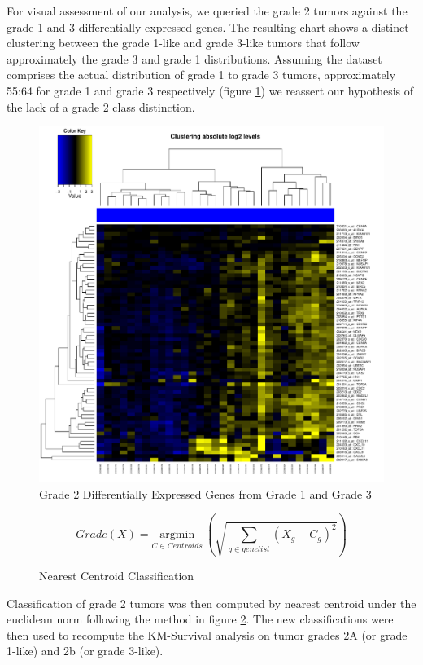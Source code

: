 \documentclass[a4paper,10pt]{article}
\begin{document}
For visual assessment of our analysis, we queried the grade 2 tumors against the grade 1 and 3 differentially expressed genes. The resulting chart
shows a distinct clustering between the grade 1-like and grade 3-like tumors that follow approximately 
the grade 3 and grade 1 distributions. Assuming the dataset comprises the actual distribution 
of grade 1 to grade 3 tumors, approximately 55:64 for grade 1 and grade 3 respectively (figure \ref{grade2up}) we reassert our hypothesis
of the lack of a grade 2 class distinction.
\begin{figure}
\centering
\includegraphics[scale=0.30]{docs/grade2onupregulated3}
\caption{Grade 2 Differentially Expressed Genes from Grade 1 and Grade 3}\label{grade2up}
\end{figure}
\begin{figure}
 $$
Grade(X) = \underset{C \in Centroids} {\mathrm{argmin}} ~ \left( \sqrt{\sum_{g\in genelist}{ (X_{g} - C_{g})^2}}\right)
$$
\caption{Nearest Centroid Classification}\label{classify}
\end{figure}
Classification of grade 2 tumors was then computed by nearest centroid under the euclidean norm following the method in figure \ref{classify}.
The new classifications were then used to recompute the KM-Survival analysis on tumor grades 2A (or grade 1-like) and 2b (or grade 3-like).
\end{document}
